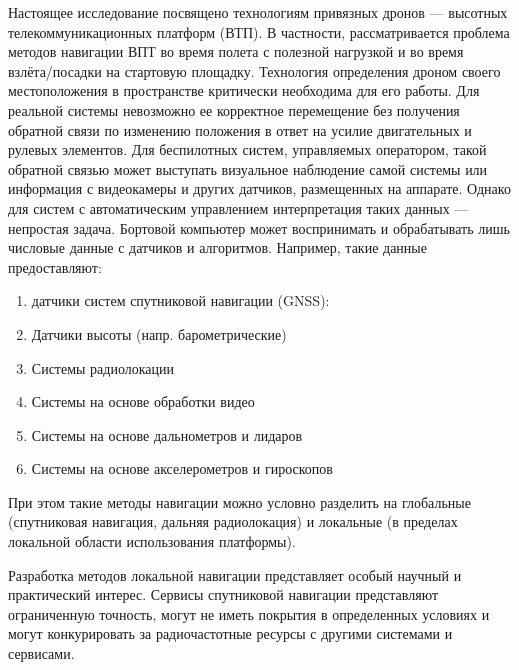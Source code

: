 Настоящее исследование посвящено технологиям привязных дронов --- 
высотных телекоммуникационных платформ (ВТП). %
В частности, рассматривается проблема методов навигации ВПТ во время полета с 
полезной нагрузкой и во время взлёта/посадки на стартовую площадку. 
Технология определения дроном своего местоположения в пространстве критически 
необходима для его работы. 
Для реальной системы невозможно ее корректное перемещение без получения обратной
связи по изменению положения в ответ на усилие двигательных и рулевых элементов.
Для беспилотных систем, управляемых оператором, такой обратной связью может 
выступать визуальное наблюдение самой системы или информация с видеокамеры и 
других датчиков, размещенных на аппарате.
    Однако для систем с автоматическим управлением интерпретация таких данных 
    --- непростая задача. 
    Бортовой компьютер может воспринимать и обрабатывать 
    лишь числовые данные с датчиков и алгоритмов.
    Например, такие данные предоставляют:
    \begin{enumerate}
        \item датчики систем спутниковой навигации (GNSS): 
        \item Датчики высоты (напр. барометрические)
        \item Системы радиолокации
        \item Системы на основе обработки видео
        \item Системы на основе дальнометров и лидаров
        \item Системы на основе акселерометров и гироскопов
    \end{enumerate} 
    При этом такие методы навигации можно условно разделить на глобальные 
    (спутниковая навигация, дальняя радиолокация) и локальные 
    (в пределах локальной области использования платформы).

Разработка методов локальной навигации представляет особый научный и практический 
интерес.
Сервисы спутниковой навигации представляют ограниченную точность, %
могут не иметь покрытия в определенных условиях и могут конкурировать за 
радиочастотные ресурсы с другими системами и сервисами.

